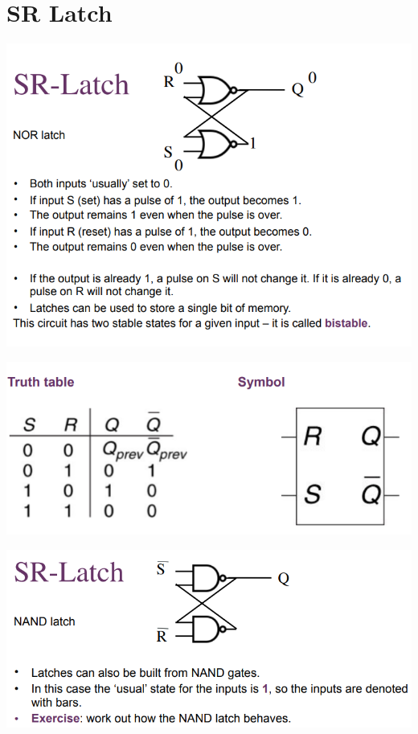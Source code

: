 \documentclass{article}[18pt]
\begin{document}
\section{SR Latch}
\begin{center}
	\includegraphics[scale=0.7]{figure2}
\end{center}
\begin{center}
	\includegraphics[scale=0.7]{figure3}
\end{center}
\begin{center}
	\includegraphics[scale=0.7]{figure4}
\end{center}
\end{document}
